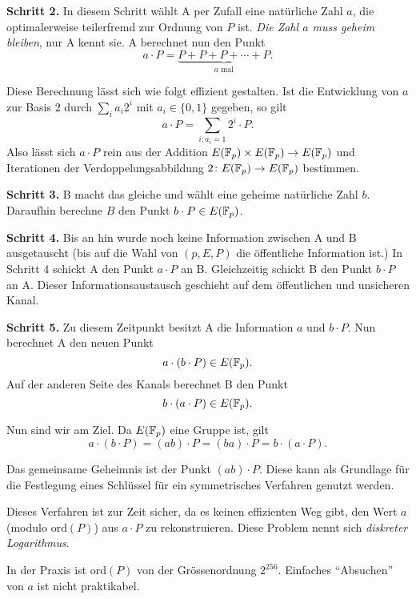 \bigskip
\textbf{Schritt 2.} In diesem Schritt wählt A per Zufall eine
natürliche Zahl $a$, die optimalerweise teilerfremd zur Ordnung von
$P$ ist. \emph{Die Zahl $a$ muss geheim bleiben}, nur A kennt sie. A berechnet nun den Punkt
$$
a\cdot P = \underbrace{P+P+P+\cdots + P}_{\text{$a$ mal}}.
$$

Diese Berechnung lässt sich wie folgt effizient gestalten.
Ist die Entwicklung von $a$ zur Basis $2$ durch $\sum_{i} a_i 2^i$ mit
$a_{i}\in \{0,1\}$ gegeben, so gilt
$$
a\cdot P =\sum_{i : a_i=1} 2^i \cdot P.$$
Also lässt sich $a \cdot P$ rein aus der  Addition $E({\mathbb{F}}_p)\times
E({\mathbb{F}}_p)\rightarrow E({\mathbb{F}}_p)$  und Iterationen der
Verdoppelungsabbildung  $2\colon E({\mathbb{F}}_p)\rightarrow E({\mathbb{F}}_p)$
bestimmen. 

\bigskip
\textbf{Schritt 3.} B macht das gleiche und wählt eine geheime natürliche Zahl
$b$. Daraufhin berechne $B$ den Punkt $b\cdot P \in E({\mathbb{F}}_p)$.

\bigskip
\textbf{Schritt 4.} Bis an hin wurde noch keine Information zwischen A
und B ausgetauscht (bis auf die Wahl von $(p,E,P)$ die öffentliche
Information ist.)
In Schritt 4 schickt A den Punkt $a\cdot P$ an B. Gleichzeitig schickt
B den Punkt
$b\cdot P$ an A. Dieser Informationsaustausch geschieht auf dem
öffentlichen und unsicheren Kanal. 


\bigskip
\textbf{Schritt 5.} Zu diesem Zeitpunkt besitzt A die Information $a$
und $b\cdot P$. Nun berechnet A den neuen Punkt
\begin{equation*}
  a\cdot (b\cdot P) \in E({\mathbb{F}}_p).
\end{equation*}
Auf der anderen Seite des Kanals berechnet B den Punkt
\begin{equation*}
  b\cdot (a\cdot P) \in E({\mathbb{F}}_p).
\end{equation*}

Nun sind wir am Ziel. Da $E({\mathbb{F}}_p)$ eine Gruppe ist,
gilt
$$
a\cdot (b\cdot P) = (ab)\cdot P = (ba) \cdot P = b\cdot (a\cdot P).$$

Das gemeinsame Geheimnis ist der Punkt $(ab)\cdot P$. Diese kann als
Grundlage für die Festlegung eines Schlüssel für ein symmetrisches
Verfahren genutzt werden.

\bigskip

Dieses Verfahren ist zur Zeit sicher, da es  keinen  effizienten Weg
gibt, den Wert $a$ (modulo $\mathrm{ord}(P)$)
aus $a\cdot P$ zu rekonstruieren. Diese Problem nennt sich
\emph{diskreter Logarithmus}.

In der Praxis ist $\mathrm{ord}(P)$
von der Grössenordnung $2^{256}$. Einfaches ``Absuchen'' von $a$ ist
nicht praktikabel.

